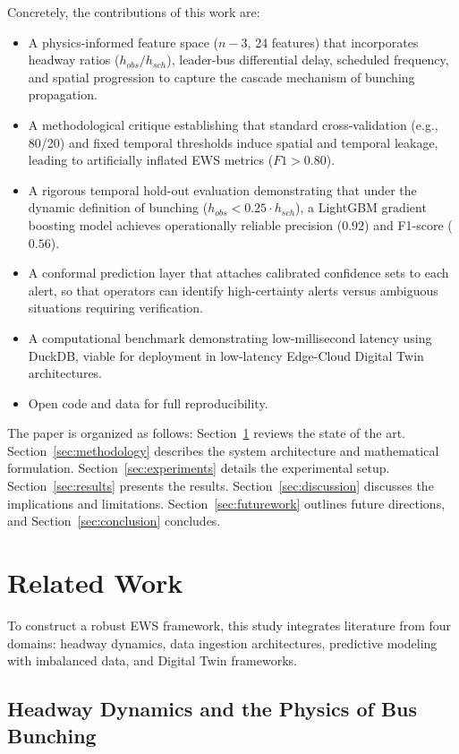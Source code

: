 \documentclass[fleqn,10pt,lineno]{wlpeerj}
\begin{document}
Concretely, the contributions of this work are:
\begin{itemize}
  \item A physics-informed feature space ($n{-}3$, 24 features) that incorporates headway ratios ($h_{obs}/h_{sch}$), leader-bus differential delay, scheduled frequency, and spatial progression to capture the cascade mechanism of bunching propagation.
  \item A methodological critique establishing that standard cross-validation (e.g., 80/20) and fixed temporal thresholds induce spatial and temporal leakage, leading to artificially inflated EWS metrics ($F1 > 0.80$).
  \item A rigorous temporal hold-out evaluation demonstrating that under the dynamic definition of bunching ($h_{obs} < 0.25 \cdot h_{sch}$), a LightGBM gradient boosting model achieves operationally reliable precision ($0.92$) and F1-score ($0.56$).
  \item A conformal prediction layer that attaches calibrated confidence sets to each alert, so
    that operators can identify high-certainty alerts versus ambiguous situations requiring
    verification.
  \item A computational benchmark demonstrating low-millisecond latency using DuckDB, viable
    for deployment in low-latency Edge-Cloud Digital Twin architectures.
  \item Open code and data for full reproducibility.
\end{itemize}

The paper is organized as follows: Section~\ref{sec:related} reviews the state of the art.
Section~\ref{sec:methodology} describes the system architecture and mathematical formulation.
Section~\ref{sec:experiments} details the experimental setup. Section~\ref{sec:results} presents
the results. Section~\ref{sec:discussion} discusses the implications and limitations.
Section~\ref{sec:futurework} outlines future directions, and Section~\ref{sec:conclusion}
concludes.

\section{Related Work}
\label{sec:related}

To construct a robust EWS framework, this study integrates literature from four domains: headway
dynamics, data ingestion architectures, predictive modeling with imbalanced data, and Digital
Twin frameworks.

\subsection{Headway Dynamics and the Physics of Bus Bunching}
\end{document}
